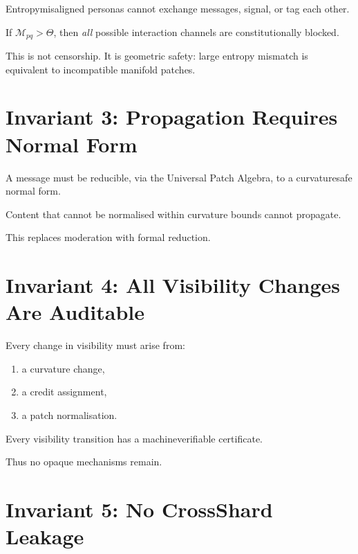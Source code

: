 Entropy\textendash misaligned personas cannot exchange messages,
signal, or tag each other.

\begin{invariant}
If $\mathcal{M}_{pq} > \Theta$,
then \emph{all} possible interaction channels are constitutionally blocked.
\end{invariant}

This is not censorship.
It is geometric safety:
large entropy mismatch is equivalent to incompatible manifold patches.

\section{Invariant 3: Propagation Requires Normal Form}

A message must be reducible, via the Universal Patch Algebra,
to a curvature\textendash safe normal form.

\begin{invariant}
Content that cannot be normalised within curvature bounds
cannot propagate.
\end{invariant}

This replaces moderation with formal reduction.

\section{Invariant 4: All Visibility Changes Are Auditable}

Every change in visibility must arise from:

\begin{enumerate}
    \item a curvature change,
    \item a credit assignment,
    \item a patch normalisation.
\end{enumerate}

\begin{invariant}[Auditability]
Every visibility transition has a machine\textendash verifiable certificate.
\end{invariant}

Thus no opaque mechanisms remain.

\section{Invariant 5: No Cross\textendash Shard Leakage}

